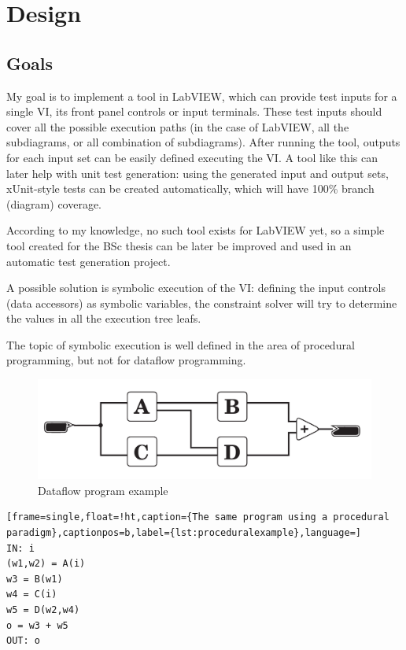 \chapter{Design}
\section{Goals}
My goal is to implement a tool in LabVIEW, which can provide test inputs for a single VI, its front panel controls or input terminals. These test inputs should cover all the possible execution paths (in the case of LabVIEW, all the subdiagrams, or all combination of subdiagrams). After running the tool, outputs for each input set can be easily defined executing the VI. A tool like this can later help with unit test generation: using the generated input and output sets, xUnit-style tests can be created automatically, which will have 100\% branch (diagram) coverage.

According to my knowledge, no such tool exists for LabVIEW yet, so a simple tool created for the BSc thesis can be later be improved and used in an automatic test generation project.

A possible solution is symbolic execution of the VI: defining the input controls (data accessors) as symbolic variables, the constraint solver will try to determine the values in all the execution tree leafs.

The topic of symbolic execution is well defined in the area of procedural programming, but not for dataflow programming.

\begin{figure}
\includegraphics[width=150mm,keepaspectratio]{figures/vi1.pdf}
\caption{Dataflow program example} 
\label{fig:dataflowexample}
\end{figure}

\begin{lstlisting}[frame=single,float=!ht,caption={The same program using a procedural paradigm},captionpos=b,label={lst:proceduralexample},language=]
IN: i
(w1,w2) = A(i)
w3 = B(w1)
w4 = C(i)
w5 = D(w2,w4)
o = w3 + w5
OUT: o
\end{lstlisting}

